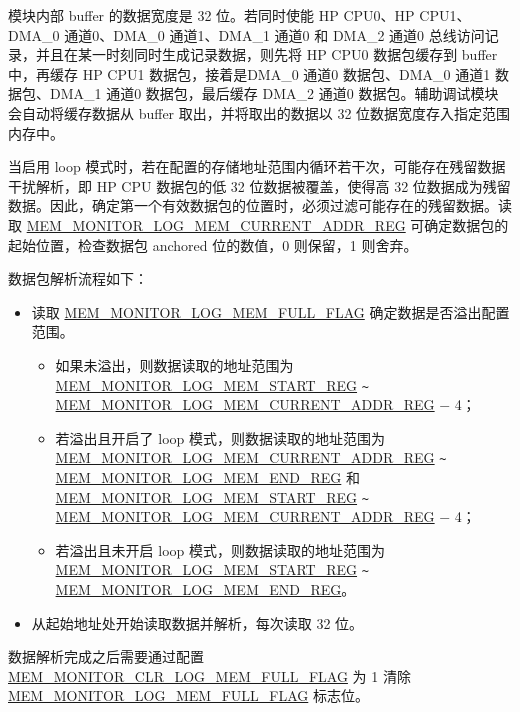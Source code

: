 \documentclass[main\_\_CN.tex]{subfiles}
\begin{document}
模块内部 buffer 的数据宽度是 32 位。若同时使能 HP CPU0、HP CPU1、DMA\_0 通道0、DMA\_0 通道1、DMA\_1 通道0 和 DMA\_2 通道0 总线访问记录，并且在某一时刻同时生成记录数据，则先将 HP CPU0 数据包缓存到 buffer 中，再缓存 HP CPU1 数据包，接着是DMA\_0 通道0 数据包、DMA\_0 通道1 数据包、DMA\_1 通道0 数据包，最后缓存 DMA\_2 通道0 数据包。辅助调试模块会自动将缓存数据从 buffer 取出，并将取出的数据以 32 位数据宽度存入指定范围内存中。

当启用 loop 模式时，若在配置的存储地址范围内循环若干次，可能存在残留数据干扰解析，即 HP CPU 数据包的低 32 位数据被覆盖，使得高 32 位数据成为残留数据。因此，确定第一个有效数据包的位置时，必须过滤可能存在的残留数据。读取 \hyperref[regdesc:MEMMONITORLOGMEMCURRENTADDRREG]{MEM\_MONITOR\_LOG\_MEM\_CURRENT\_ADDR\_REG} 可确定数据包的起始位置，检查数据包 anchored 位的数值，0 则保留，1 则舍弃。

数据包解析流程如下：

\begin{itemize}
    \item 读取 \hyperref[fielddesc:MEMMONITORLOGMEMFULLFLAG]{MEM\_MONITOR\_LOG\_MEM\_FULL\_FLAG} 确定数据是否溢出配置范围。
    \begin{itemize}
        \item 如果未溢出，则数据读取的地址范围为 \hyperref[regdesc:MEMMONITORLOGMEMSTARTREG]{MEM\_MONITOR\_LOG\_MEM\_START\_REG} \verb+~+ \hyperref[regdesc:MEMMONITORLOGMEMCURRENTADDRREG]{MEM\_MONITOR\_LOG\_MEM\_CURRENT\_ADDR\_REG} $-$ 4；
        \item 若溢出且开启了 loop 模式，则数据读取的地址范围为 \hyperref[regdesc:MEMMONITORLOGMEMCURRENTADDRREG]{MEM\_MONITOR\_LOG\_MEM\_CURRENT\_ADDR\_REG} \verb+~+ \hyperref[regdesc:MEMMONITORLOGMEMENDREG]{MEM\_MONITOR\_LOG\_MEM\_END\_REG} 和 \hyperref[regdesc:MEMMONITORLOGMEMSTARTREG]{MEM\_MONITOR\_LOG\_MEM\_START\_REG} \verb+~+ \hyperref[regdesc:MEMMONITORLOGMEMCURRENTADDRREG]{MEM\_MONITOR\_LOG\_MEM\_CURRENT\_ADDR\_REG} $-$ 4；
        \item 若溢出且未开启 loop 模式，则数据读取的地址范围为 \hyperref[regdesc:MEMMONITORLOGMEMSTARTREG]{MEM\_MONITOR\_LOG\_MEM\_START\_REG} \verb+~+ \hyperref[regdesc:MEMMONITORLOGMEMENDREG]{MEM\_MONITOR\_LOG\_MEM\_END\_REG}。
    \end{itemize}
    \item 从起始地址处开始读取数据并解析，每次读取 32 位。
\end{itemize}

数据解析完成之后需要通过配置 \hyperref[fielddesc:MEMMONITORCLRLOGMEMFULLFLAG]{MEM\_MONITOR\_CLR\_LOG\_MEM\_FULL\_FLAG} 为 1 清除 \hyperref[fielddesc:MEMMONITORLOGMEMFULLFLAG]{MEM\_MONITOR\_LOG\_MEM\_FULL\_FLAG} 标志位。
\end{document}
